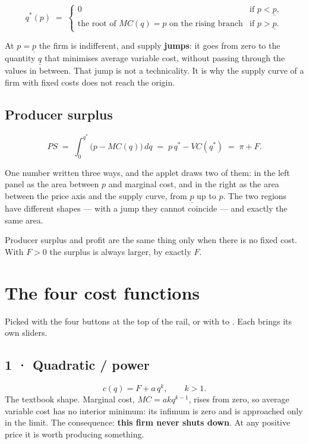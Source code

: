 \documentclass[11pt,a4paper]{appletmanual}
\begin{document}
\[
  q^\ast(p) \;=\;
  \begin{cases}
    0 & \text{if } p < \underline{p},\\[2pt]
    \text{the root of } MC(q) = p \text{ on the rising branch} & \text{if } p > \underline{p}.
  \end{cases}
\]

At $p = \underline{p}$ the firm is indifferent, and supply \textbf{jumps}: it
goes from zero to the quantity $\underline{q}$ that minimises average variable
cost, without passing through the values in between. That jump is not a
technicality. It is why the supply curve of a firm with fixed costs does not
reach the origin.

\subsection{Producer surplus}

\[
  PS \;=\; \int_0^{q^\ast}\!\bigl(p - MC(q)\bigr)\,dq
       \;=\; p\,q^\ast - VC(q^\ast)
       \;=\; \pi + F.
\]

One number written three ways, and the applet draws two of them: in the left
panel as the area between $p$ and marginal cost, and in the right as the area
between the price axis and the supply curve, from $\underline{p}$ up to $p$.
The two regions have different shapes --- with a jump they cannot coincide ---
and exactly the same area.

\begin{amnote}
Producer surplus and profit are the same thing only when there is no fixed
cost. With $F > 0$ the surplus is always larger, by exactly $F$.
\end{amnote}

\section{The four cost functions}

Picked with the four buttons at the top of the rail, or with  to
. Each brings its own sliders.

\subsection{1 · Quadratic / power}

\[
  c(q) = F + a\,q^{k}, \qquad k > 1.
\]
The textbook shape. Marginal cost, $MC = a k q^{k-1}$, rises from zero, so
average variable cost has no interior minimum: its infimum is zero and is
approached only in the limit. The consequence: \textbf{this firm never shuts
down}. At any positive price it is worth producing something.
\end{document}
